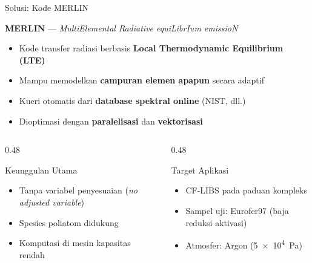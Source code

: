 \documentclass[aspectratio=169, 10pt]{beamer}
\begin{document}
\begin{frame}{Solusi: Kode MERLIN}
  \begin{block}{\textbf{MERLIN} --- \textit{MultiElemental Radiative equiLibrIum emissioN}}
    \begin{itemize}
      \item Kode transfer radiasi berbasis \textbf{Local Thermodynamic Equilibrium (LTE)}
      \item Mampu memodelkan \textbf{campuran elemen apapun} secara adaptif
      \item Kueri otomatis dari \textbf{database spektral online} (NIST, dll.)
      \item Dioptimasi dengan \textbf{paralelisasi} dan \textbf{vektorisasi}
    \end{itemize}
  \end{block}

  \vspace{6pt}
  \begin{columns}[T]
    \begin{column}{0.48\textwidth}
      \begin{exampleblock}{Keunggulan Utama}
        \begin{itemize}
          \item Tanpa variabel penyesuaian (\textit{no adjusted variable})
          \item Spesies poliatom didukung
          \item Komputasi di mesin kapasitas rendah
        \end{itemize}
      \end{exampleblock}
    \end{column}
    \begin{column}{0.48\textwidth}
      \begin{exampleblock}{Target Aplikasi}
        \begin{itemize}
          \item CF-LIBS pada paduan kompleks
          \item Sampel uji: Eurofer97 (baja reduksi aktivasi)
          \item Atmosfer: Argon (\SI{5e4}{Pa})
        \end{itemize}
      \end{exampleblock}
    \end{column}
  \end{columns}
\end{frame}
\end{document}
